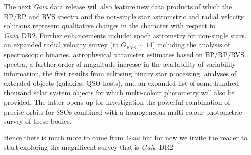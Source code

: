 \documentclass[longauth]{aa_gaia} %
\newcommand\gaia{\textit{Gaia}}
\newcommand\gdr[1]{\gaia~DR#1}
\newcommand\grvs{\ensuremath{G_\mathrm{RVS}}}
\begin{document}
The next {\gaia} data release will also feature new data products of which the BP/RP and RVS spectra
and the non-single star astrometric and radial velocity solutions represent qualitative changes in
the character with respect to \gdr{2}. Further enhancements include: epoch astrometry for
non-single stars, an expanded radial velocity survey (to $\grvs\sim14$) including the analysis of
spectroscopic binaries, astrophysical parameter estimates based on BP/RP/RVS spectra, a further
order of magnitude increase in the availability of variability information, the first results from
eclipsing binary star processing, analyses of extended objects (galaxies, QSO hosts), and an expanded
list of some hundred thousand solar system objects for which multi-colour photometry will also be
provided. The latter opens up for investigation the powerful combination of precise orbits for
SSOs combined with a homogeneous multi-colour photometric survey of these bodies.

Hence there is much more to come from {\gaia} but for now we invite the reader to start exploring
the magnificent survey that is \gdr{2}.

%
%
\end{document}
